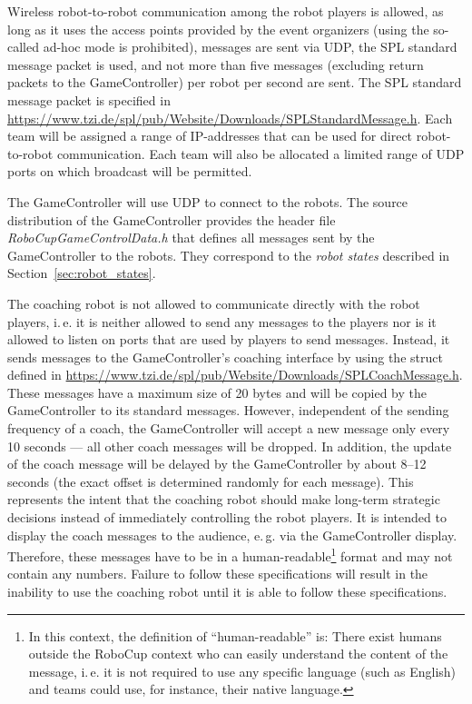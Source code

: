 \documentclass[12pt]{article}
\newcommand{\ie}{\mbox{i.\,e.}\xspace}
\newcommand{\eg}{\mbox{e.\,g.}\xspace}
\begin{document}
Wireless robot-to-robot communication among the robot players is allowed, as long as it uses the access points provided by the event organizers (using the so-called ad-hoc mode is prohibited), messages are sent via UDP, the SPL standard message packet is used, and not more than five messages (excluding return packets to the GameController) per robot per second are sent. The SPL standard message packet is specified in \url{https://www.tzi.de/spl/pub/Website/Downloads/SPLStandardMessage.h}. Each team will be assigned a range of IP-addresses that can be used for direct robot-to-robot communication. Each team will also be allocated a limited range of UDP ports on which broadcast will be permitted.

The GameController will use UDP to connect to the robots. The source distribution of the GameController provides the header file \emph{RoboCupGameControlData.h} that defines all messages sent by the GameController to the robots. They correspond to the \emph{robot states} described in Section~\ref{sec:robot_states}.

The coaching robot is not allowed to communicate directly with the robot players, \ie it is neither allowed to send any messages to the players nor is it allowed to listen on ports that are used by players to send messages. Instead, it sends messages to the GameController's coaching interface by using the struct defined in \url{https://www.tzi.de/spl/pub/Website/Downloads/SPLCoachMessage.h}. These messages have a maximum size of 20 bytes and will be copied by the GameController to its standard messages. However, independent of the sending frequency of a coach, the GameController will accept a new message only every 10 seconds --- all other coach messages will be dropped. In addition, the update of the coach message will be delayed by the GameController by about 8--12 seconds (the exact offset is determined randomly for each message). This represents the intent that the coaching robot should make long-term strategic decisions instead of immediately controlling the robot players. It is intended to display the coach messages to the audience, \eg via the GameController display. Therefore, these messages have to be in a human-readable\footnote{In this context, the definition of ``human-readable'' is: There exist humans outside the RoboCup context who can easily understand the content of the message, \ie it is not required to use any specific language (such as English) and teams could use, for instance, their native language.} format and may not contain any numbers.  Failure to follow these specifications will result in the inability to use the coaching robot until it is able to follow these specifications.
\end{document}
